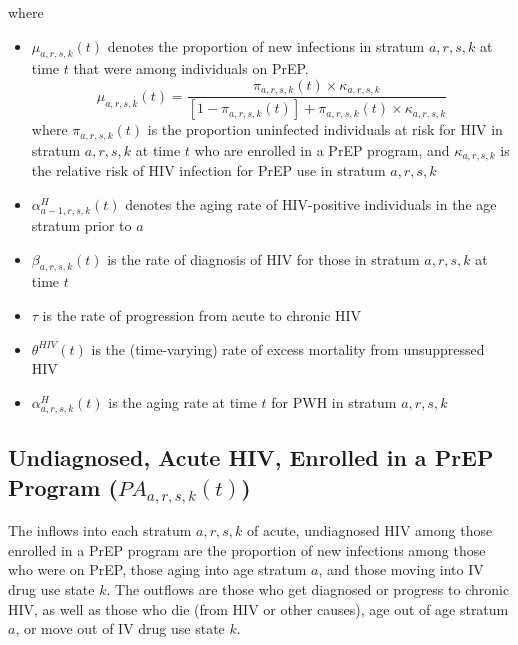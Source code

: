 \documentclass{article}
\begin{document}
where
\begin{itemize}
	\item $\mu_{a,r,s,k}(t)$ denotes the proportion of new infections in stratum $a,r,s,k$ at time $t$ that were among individuals on PrEP. 
	\begin{equation*}
		\mu_{a,r,s,k}(t) = \frac{\pi_{a,r,s,k}(t) \times \kappa_{a,r,s,k}}{[1-\pi_{a,r,s,k}(t)] + \pi_{a,r,s,k}(t) \times \kappa_{a,r,s,k}}
	\end{equation*} where $\pi_{a,r,s,k}(t)$ is the proportion uninfected individuals at risk for HIV in stratum $a,r,s,k$ at time $t$ who are enrolled in a PrEP program, and $\kappa_{a,r,s,k}$ is the relative risk of HIV infection for PrEP use in stratum $a,r,s,k$
	\item $\alpha_{a-1,r,s,k}^H(t)$ denotes the aging rate of HIV-positive individuals in the age stratum prior to $a$
	\item $\beta_{a,r,s,k}(t)$ is the rate of diagnosis of HIV for those in stratum $a,r,s,k$ at time $t$
	\item $\tau$ is the rate of progression from acute to chronic HIV
	\item $\theta^{HIV}(t)$ is the (time-varying) rate of excess mortality from unsuppressed HIV
	\item $\alpha^H_{a,r,s,k}(t)$ is the aging rate at time $t$ for PWH in stratum $a,r,s,k$
\end{itemize}

\subsection{Undiagnosed, Acute HIV, Enrolled in a PrEP Program \big($PA_{a,r,s,k}(t)$\big)}

The inflows into each stratum $a,r,s,k$ of acute, undiagnosed HIV among those enrolled in a PrEP program are the proportion of new infections among those who were on PrEP, those aging into age stratum $a$, and those moving into IV drug use state $k$. The outflows are those who get diagnosed or progress to chronic HIV, as well as those who die (from HIV or other causes), age out of age stratum $a$, or move out of IV drug use state $k$.
\end{document}
